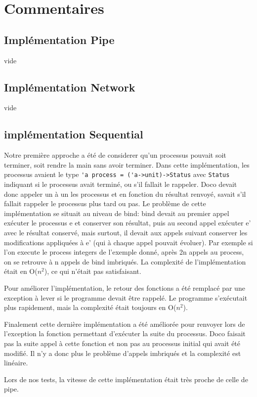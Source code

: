 \documentclass[a4paper]{article}
\begin{document}
\section{Commentaires}

\subsection{Implémentation Pipe}
vide
\subsection{Implémentation Network}
vide
\subsection{implémentation Sequential}
Notre première approche a été de considerer qu'un processus pouvait soit terminer, soit rendre la main sans avoir terminer. Dans cette implémentation, les processus avaient le type \verb!'a process = ('a->unit)->Status! avec \verb!Status! indiquant si le processus avait terminé, ou s'il fallait le rappeler. Doco devait donc appeler un à un les processus et en fonction du résultat renvoyé, savait s'il fallait rappeler le processus plus tard ou pas. 
Le problème de cette implémentation se situait au niveau de bind: bind devait au premier appel exécuter le processus e et conserver son résultat, puis au second appel exécuter e' avec le résultat conservé, mais surtout, il devait aux appels suivant conserver les modifications appliquées à e' (qui à chaque appel pouvait évoluer). Par exemple si l'on execute le process integers de l'exemple donné, après 2n appels au process, on se retrouve à n appels de bind imbriqués. La complexité de l'implémentation était en O($n^2$), ce qui n'était pas satisfaisant.

Pour améliorer l'implémentation, le retour des fonctions a été remplacé par une exception à lever si le programme devait être rappelé. Le programme s'exécutait plus rapidement, mais la complexité était toujours en O($n^2$).

Finalement cette dernière implémentation a été améliorée pour renvoyer lors de l'exception la fonction permettant d'exécuter la suite du processus. Doco faisait pas la suite appel à cette fonction et non pas au processus initial qui avait été modifié. Il n'y a donc plus le problème d'appels imbriqués et la complexité est linéaire.

Lors de nos tests, la vitesse de cette implémentation était très proche de celle de pipe.
\end{document}
